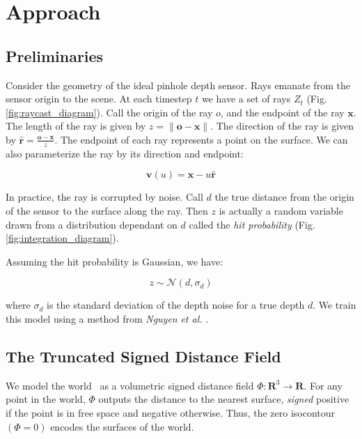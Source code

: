 \documentclass[conference]{IEEEtran}
\newcommand{\figref}[1]{Fig.\ref{#1}}
\newcommand{\etal}{\textit{et al.}}
\begin{document}
\section{Approach} 
\subsection{Preliminaries}
\label{section:prelim}
Consider the geometry of the ideal pinhole depth sensor. Rays emanate from the
sensor origin to the scene.  At each timestep $t$ we have a set of
rays $Z_t$ (\figref{fig:raycast_diagram}). Call the origin of the ray $o$, and the endpoint of the ray $\mathbf{x}$. 
The length of the ray is given by $z = \|\mathbf{o}
- \mathbf{x}\|$. The direction of the ray is given by $\mathbf{\hat{r}} =
\frac{\mathbf{o} - \mathbf{x}}{z}$. The endpoint of each ray represents a point
on the surface.  We can also parameterize the ray by its direction and endpoint: 

 \begin{equation}
 	\mathbf{v}(u) = \mathbf{x} - u\mathbf{\hat{r}}
 \end{equation}

In practice, the ray is corrupted by noise. Call $d$ the true
distance from the origin of the sensor to the surface along the ray. Then $z$
is actually a random variable drawn from a distribution dependant on $d$ called
the \textit{hit probability} (\figref{fig:integration_diagram}). 

Assuming the hit probability is Gaussian, we have:

\begin{equation}
\label{eqn:hitprobability}
z \sim \mathcal{N}(d, \sigma_d)
\end{equation}

\noindent where $\sigma_d$ is the standard deviation of the depth noise for a
true depth $d$. We train this model using a method from \textit{Nguyen} \etal
\cite{Nguyen2012}.


\subsection{The Truncated Signed Distance Field}
\label{section:TSDF}
We model the world~\cite{Curless1996} as a volumetric signed distance field $\Phi: \mathbf{R}^3
\to \mathbf{R}$. For any point in the world, $\Phi$
outputs the distance to the nearest surface, \emph{signed} positive if the point
is in free space and negative otherwise. Thus, the zero isocontour $(\Phi = 0)$
encodes the surfaces of the world.
\end{document}
